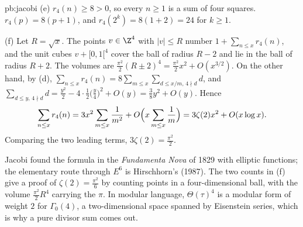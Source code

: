 \begin{solution}{pb:jacobi}
(e) $r_4(n)\ge8>0$, so every $n\ge1$ is a sum of four squares. $r_4(p)=8(p+1)$, and $r_4(2^k)=8(1+2)=24$ for $k\ge1$.

(f) Let $R=\sqrt x$. The points $v\in\Z^4$ with $|v|\le R$ number $1+\sum_{n\le x}r_4(n)$, and the unit cubes $v+[0,1[^4$ cover the ball of radius $R-2$ and lie in the
ball of radius $R+2$. The volumes are $\frac{\pi^2}2(R\pm2)^4=\frac{\pi^2}2x^2+O(x^{3/2})$. On the other hand, by (d),
$\sum_{n\le x}r_4(n)=8\sum_{m\le x}\sum_{d\le x/m,\,4\nmid d}d$, and $\sum_{d\le y,\,4\nmid d}d=\frac{y^2}2-4\cdot\frac12\bigl(\frac y4\bigr)^2+O(y)=\frac38y^2+O(y)$. Hence
\[
\sum_{n\le x}r_4(n)=3x^2\sum_{m\le x}\frac1{m^2}+O\Bigl(x\sum_{m\le x}\frac1m\Bigr)=3\zeta(2)x^2+O(x\log x).
\]
Comparing the two leading terms, $3\zeta(2)=\frac{\pi^2}2$.


\leads Jacobi found the formula in the \emph{Fundamenta Nova} of 1829 with elliptic functions; the elementary route through $E^6$ is Hirschhorn's (1987). The two counts in (f)
give a proof of $\zeta(2)=\frac{\pi^2}6$ by counting points in a four-dimensional ball, with the volume $\frac{\pi^2}2R^4$ carrying the $\pi$. In modular language, $\Theta(\tau)^4$ is a modular form of weight $2$ for $\Gamma_0(4)$, a two-dimensional space spanned by Eisenstein
series, which is why a pure divisor sum comes out.
\end{solution}

